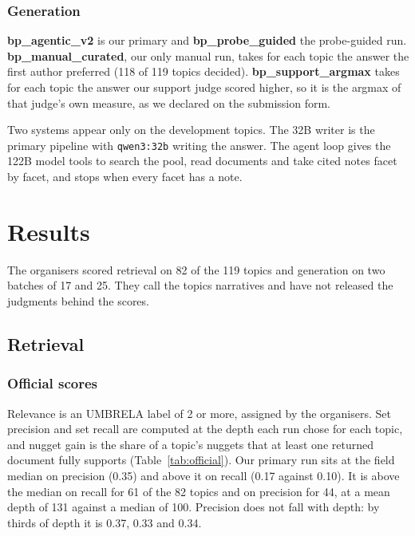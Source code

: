 \documentclass[sigconf,nonacm]{acmart}
\newcommand{\run}[1]{\mbox{\textbf{#1}}}   %
\begin{document}
\subsubsection{Generation}
\run{bp\_agentic\_v2} is our primary and \run{bp\_probe\_guided} the probe-guided
run. \run{bp\_manual\_curated}, our only manual run, takes for each topic the answer
the first author preferred (118 of 119 topics decided). \run{bp\_support\_argmax}
takes for each topic the answer our support judge scored higher, so it is the argmax
of that judge's own measure, as we declared on the submission form.

Two systems appear only on the development topics. The 32B writer is the primary
pipeline with \texttt{qwen3:32b} writing the answer. The agent loop gives the 122B
model tools to search the pool, read documents and take cited notes facet by facet,
and stops when every facet has a note.

\section{Results}

The organisers scored retrieval on 82 of the 119 topics and generation on two
batches of 17 and 25. They call the topics narratives and have not released the
judgments behind the scores.

\subsection{Retrieval}
\label{sec:retrieval-results}

\subsubsection{Official scores}
Relevance is an UMBRELA label of 2 or more, assigned by the organisers. Set
precision and set recall are computed at the depth each run chose for each topic,
and nugget gain is the share of a topic's nuggets that at least one returned
document fully supports (Table~\ref{tab:official}). Our primary run sits at the field
median on precision (0.35) and above it on recall (0.17 against 0.10). It is above
the median on recall for 61 of the 82 topics and on precision for 44, at a mean
depth of 131 against a median of 100. Precision does not fall with depth: by thirds
of depth it is 0.37, 0.33 and 0.34.
\end{document}
